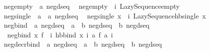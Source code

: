 \begin{isabellebody}
\isanewline
{}\isamarkupfalse%
\ neg{\isacharunderscore}{\kern0pt}empty\ {\isacharcolon}{\kern0pt}{\isacharcolon}{\kern0pt}\ {\isachardoublequoteopen}{\isacharprime}{\kern0pt}a\ neg{\isacharunderscore}{\kern0pt}dseq{\isachardoublequoteclose}\isanewline
{}\isanewline
\ \ {\isachardoublequoteopen}neg{\isacharunderscore}{\kern0pt}empty\ {\isacharequal}{\kern0pt}\ {\isacharparenleft}{\kern0pt}{\isasymlambda}i{\isachardot}{\kern0pt}\ Lazy{\isacharunderscore}{\kern0pt}Sequence{\isachardot}{\kern0pt}empty{\isacharparenright}{\kern0pt}{\isachardoublequoteclose}\isanewline
\isanewline
{}\isamarkupfalse%
\ neg{\isacharunderscore}{\kern0pt}single\ {\isacharcolon}{\kern0pt}{\isacharcolon}{\kern0pt}\ {\isachardoublequoteopen}{\isacharprime}{\kern0pt}a\ {\isasymRightarrow}\ {\isacharprime}{\kern0pt}a\ neg{\isacharunderscore}{\kern0pt}dseq{\isachardoublequoteclose}\isanewline
{}\isanewline
\ \ {\isachardoublequoteopen}neg{\isacharunderscore}{\kern0pt}single\ x\ {\isacharequal}{\kern0pt}\ {\isacharparenleft}{\kern0pt}{\isasymlambda}i{\isachardot}{\kern0pt}\ Lazy{\isacharunderscore}{\kern0pt}Sequence{\isachardot}{\kern0pt}hb{\isacharunderscore}{\kern0pt}single\ x{\isacharparenright}{\kern0pt}{\isachardoublequoteclose}\isanewline
\isanewline
{}\isamarkupfalse%
\ neg{\isacharunderscore}{\kern0pt}bind\ {\isacharcolon}{\kern0pt}{\isacharcolon}{\kern0pt}\ {\isachardoublequoteopen}{\isacharprime}{\kern0pt}a\ neg{\isacharunderscore}{\kern0pt}dseq\ {\isasymRightarrow}\ {\isacharparenleft}{\kern0pt}{\isacharprime}{\kern0pt}a\ {\isasymRightarrow}\ {\isacharprime}{\kern0pt}b\ neg{\isacharunderscore}{\kern0pt}dseq{\isacharparenright}{\kern0pt}\ {\isasymRightarrow}\ {\isacharprime}{\kern0pt}b\ neg{\isacharunderscore}{\kern0pt}dseq{\isachardoublequoteclose}\isanewline
{}\isanewline
\ \ {\isachardoublequoteopen}neg{\isacharunderscore}{\kern0pt}bind\ x\ f\ {\isacharequal}{\kern0pt}\ {\isacharparenleft}{\kern0pt}{\isasymlambda}i{\isachardot}{\kern0pt}\ hb{\isacharunderscore}{\kern0pt}bind\ {\isacharparenleft}{\kern0pt}x\ i{\isacharparenright}{\kern0pt}\ {\isacharparenleft}{\kern0pt}{\isasymlambda}a{\isachardot}{\kern0pt}\ f\ a\ i{\isacharparenright}{\kern0pt}{\isacharparenright}{\kern0pt}{\isachardoublequoteclose}\isanewline
\isanewline
{}\isamarkupfalse%
\ neg{\isacharunderscore}{\kern0pt}decr{\isacharunderscore}{\kern0pt}bind\ {\isacharcolon}{\kern0pt}{\isacharcolon}{\kern0pt}\ {\isachardoublequoteopen}{\isacharprime}{\kern0pt}a\ neg{\isacharunderscore}{\kern0pt}dseq\ {\isasymRightarrow}\ {\isacharparenleft}{\kern0pt}{\isacharprime}{\kern0pt}a\ {\isasymRightarrow}\ {\isacharprime}{\kern0pt}b\ neg{\isacharunderscore}{\kern0pt}dseq{\isacharparenright}{\kern0pt}\ {\isasymRightarrow}\ {\isacharprime}{\kern0pt}b\ neg{\isacharunderscore}{\kern0pt}dseq{\isachardoublequoteclose}\isanewline

\end{isabellebody}
